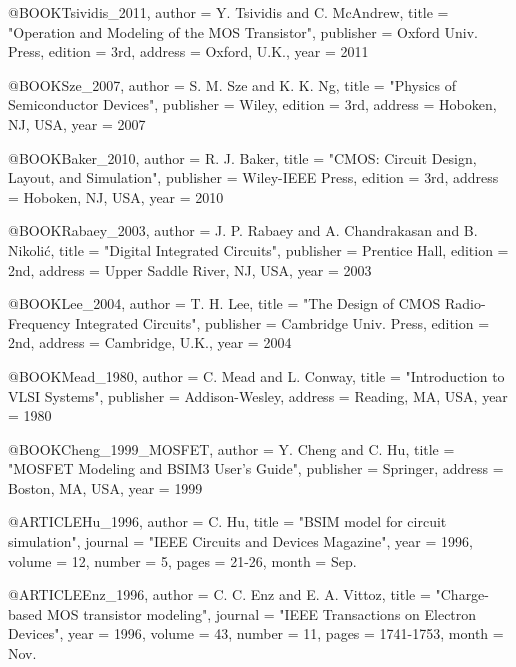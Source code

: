 \documentclass[conference]{IEEEtran}
\begin{document}
\begin{thebibliography}
@BOOK{Tsividis_2011,
    author      =   {Y. {Tsividis} and C. {McAndrew}},
    title       =   "{Operation and Modeling of the {MOS} Transistor}",
    publisher   =   {Oxford Univ. Press},
    edition     =   {3rd},
    address     =   {Oxford, U.K.},
    year        =   {2011}
}

@BOOK{Sze_2007,
    author      =   {S. M. {Sze} and K. K. {Ng}},
    title       =   "{Physics of Semiconductor Devices}",
    publisher   =   {Wiley},
    edition     =   {3rd},
    address     =   {Hoboken, NJ, USA},
    year        =   {2007}
}

@BOOK{Baker_2010,
    author      =   {R. J. {Baker}},
    title       =   "{CMOS: Circuit Design, Layout, and Simulation}",
    publisher   =   {Wiley-IEEE Press},
    edition     =   {3rd},
    address     =   {Hoboken, NJ, USA},
    year        =   {2010}
}

@BOOK{Rabaey_2003,
    author      =   {J. P. {Rabaey} and A. {Chandrakasan} and B. {Nikoli\'c}},
    title       =   "{Digital Integrated Circuits}",
    publisher   =   {Prentice Hall},
    edition     =   {2nd},
    address     =   {Upper Saddle River, NJ, USA},
    year        =   {2003}
}

@BOOK{Lee_2004,
    author      =   {T. H. {Lee}},
    title       =   "{The Design of {CMOS} Radio-Frequency Integrated Circuits}",
    publisher   =   {Cambridge Univ. Press},
    edition     =   {2nd},
    address     =   {Cambridge, U.K.},
    year        =   {2004}
}

@BOOK{Mead_1980,
    author      =   {C. {Mead} and L. {Conway}},
    title       =   "{Introduction to {VLSI} Systems}",
    publisher   =   {Addison-Wesley},
    address     =   {Reading, MA, USA},
    year        =   {1980}
}

@BOOK{Cheng_1999_MOSFET,
    author      =   {Y. {Cheng} and C. {Hu}},
    title       =   "{MOSFET Modeling and {BSIM3} User's Guide}",
    publisher   =   {Springer},
    address     =   {Boston, MA, USA},
    year        =   {1999}
}

@ARTICLE{Hu_1996,
    author      =   {C. {Hu}},
    title       =   "{BSIM model for circuit simulation}",
    journal     =   "{IEEE Circuits and Devices Magazine}",
    year        =   {1996},
    volume      =   {12},
    number      =   {5},
    pages       =   {21-26},
    month       =   {Sep.}
}

@ARTICLE{Enz_1996,
    author      =   {C. C. {Enz} and E. A. {Vittoz}},
    title       =   "{Charge-based {MOS} transistor modeling}",
    journal     =   "{IEEE Transactions on Electron Devices}",
    year        =   {1996},
    volume      =   {43},
    number      =   {11},
    pages       =   {1741-1753},
    month       =   {Nov.}
}


\end{thebibliography}
\end{document}
